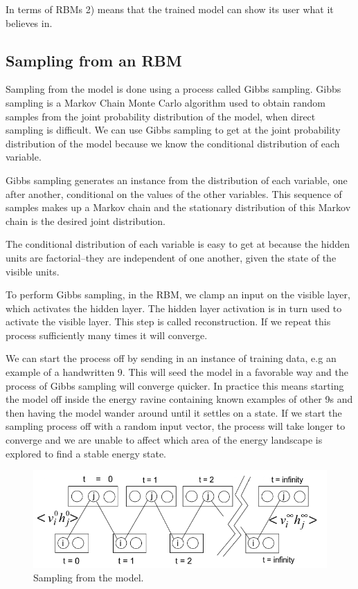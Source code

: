 \documentclass[11pt]{article}
\begin{document}
In terms of RBMs 2) means that the trained model can show its user what it believes in.

\subsection{Sampling from an RBM}

Sampling from the model is done using a process called Gibbs sampling.  Gibbs sampling is a Markov Chain Monte Carlo algorithm used to obtain random samples from the joint probability distribution of the model, when direct sampling is difficult.  We can use Gibbs sampling to get at the joint probability distribution of the model because we know the conditional distribution of each variable.

Gibbs sampling generates an instance from the distribution of each variable, one after another, conditional on the values of the other variables.  This sequence of samples makes up a Markov chain and the stationary distribution of this Markov chain is the desired joint distribution.

The conditional distribution of each variable is easy to get at because the hidden units are factorial--they are independent of one another, given the state of the visible units.

To perform Gibbs sampling, in the RBM, we clamp an input on the visible layer, which activates the hidden layer.  The hidden layer activation is in turn used to activate the visible layer.  This step is called reconstruction.  If we repeat this process sufficiently many times it will converge.

We can start the process off by sending in an instance of training data, e.g an example of a handwritten 9. This will seed the model in a favorable way and the process of Gibbs sampling will converge quicker.  In practice this means starting the model off inside the energy ravine containing known examples of other 9s and then having the model wander around until it settles on a state.  If we start the sampling process off with a random input vector, the process will take longer to converge and we are unable to affect which area of the energy landscape is explored to find a stable energy state.

\begin{figure}[htb!]
  \centering
  \includegraphics[width=\textwidth]{gibbs.png}
  \caption{Sampling from the model.}
  \label{fig:sampling}
\end{figure}
\end{document}
